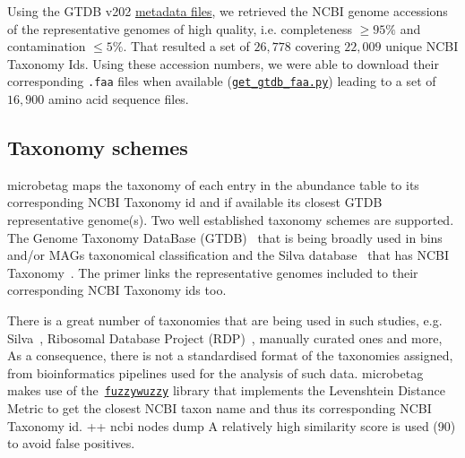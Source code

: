 \documentclass[sn-mathphys,Numbered]{sn-jnl}%
\theoremstyle{thmstyleone}%
\theoremstyle{thmstyletwo}%
\theoremstyle{thmstylethree}%
\begin{document}
        Using the GTDB v202 \href{https://data.gtdb.ecogenomic.org/releases/release202/202.0/}{metadata files}, we retrieved the NCBI genome accessions of the representative genomes of high quality, i.e. completeness $\geq 95\%$  and contamination $\leq 5\%$.
        That resulted a set of $26,778$ covering $22,009$ unique NCBI Taxonomy Ids.
        Using these accession numbers, we were able to download their corresponding \texttt{.faa} files when available (\href{https://github.com/hariszaf/microbetag/blob/develop/microbetagDB/mappings/gtdb_ncbi/get_gtdb_faa.py}{\texttt{get\_gtdb\_faa.py}}) leading to a set of $16,900$ amino acid sequence files.


    \subsection*{Taxonomy schemes}
        \label{subsec:taxonomies}

        microbetag maps the taxonomy of each entry in the abundance table to its corresponding NCBI Taxonomy id and if available its closest GTDB representative genome(s).
        Two well established taxonomy schemes are supported.
        The Genome Taxonomy DataBase (GTDB)~\cite{parks2022gtdb} that is being broadly used in bins and/or MAGs taxonomical classification
        and the Silva database~\cite{quast2012silva} that has 
        NCBI Taxonomy~\cite{schoch2020ncbi}. 
        The primer links the representative genomes included to their corresponding NCBI Taxonomy ids too. 
        
        There is a great number of taxonomies that are being used in such studies, e.g. Silva~\cite{quast2012silva}, Ribosomal Database Project (RDP)~\cite{cole2014ribosomal}, manually curated ones and more, 
        As a consequence, there is not a standardised format of the taxonomies assigned, from bioinformatics pipelines used for the analysis of such data.
        microbetag makes use of the~\href{https://github.com/seatgeek/thefuzz}{\texttt{fuzzywuzzy}} library that implements the Levenshtein Distance Metric to get the closest NCBI taxon name and thus its corresponding NCBI Taxonomy id. 
        ++ ncbi nodes dump
        A relatively high similarity score is used (90) to avoid false positives. 
\end{document}
